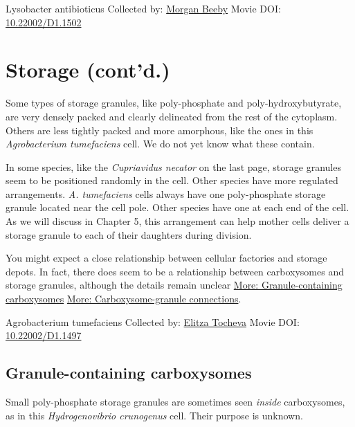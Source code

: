 \documentclass[]{tufte-book}
\begin{document}
\hypertarget{htmlwidget-955f46a968df72c0fac3}{}

\label{fig:4-8a}Lysobacter antibioticus Collected by: \protect\hyperlink{morgan_beeby}{Morgan Beeby} Movie DOI: \href{https://doi.org/10.22002/D1.1502}{10.22002/D1.1502}

\hypertarget{storage-contd.}{%
\section{Storage (cont'd.)}\label{storage-contd.}}

Some types of storage granules, like poly-phosphate and poly-hydroxybutyrate, are very densely packed and clearly delineated from the rest of the cytoplasm. Others are less tightly packed and more amorphous, like the ones in this \emph{Agrobacterium tumefaciens} cell. We do not yet know what these contain.

In some species, like the \emph{Cupriavidus necator} on the last page, storage granules seem to be positioned randomly in the cell. Other species have more regulated arrangements. \emph{A. tumefaciens} cells always have one poly-phosphate storage granule located near the cell pole. Other species have one at each end of the cell. As we will discuss in Chapter 5, this arrangement can help mother cells deliver a storage granule to each of their daughters during division.

You might expect a close relationship between cellular factories and storage depots. In fact, there does seem to be a relationship between carboxysomes and storage granules, although the details remain unclear \protect\hyperlink{Granule-containing_carboxysomes}{More: Granule-containing carboxysomes} \protect\hyperlink{Carboxysome-granule_connections}{More: Carboxysome-granule connections}.



\hypertarget{htmlwidget-66eb14bf95a41d89b870}{}

\label{fig:4-9}Agrobacterium tumefaciens Collected by: \protect\hyperlink{elitza_tocheva}{Elitza Tocheva} Movie DOI: \href{https://doi.org/10.22002/D1.1497}{10.22002/D1.1497}

\hypertarget{Granule-containing_carboxysomes}{%
\subsection{Granule-containing carboxysomes}\label{Granule-containing_carboxysomes}}

Small poly-phosphate storage granules are sometimes seen \emph{inside} carboxysomes, as in this \emph{Hydrogenovibrio crunogenus} cell. Their purpose is unknown.
\end{document}
